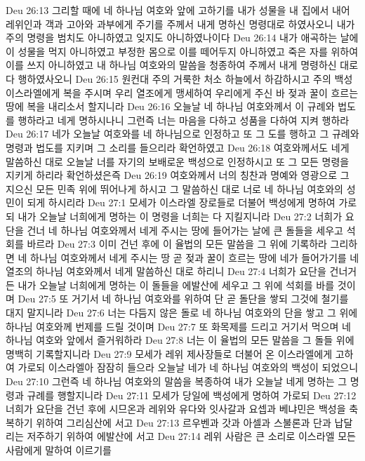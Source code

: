 Deu 26:13  그리할 때에 네 하나님 여호와 앞에 고하기를 내가 성물을 내 집에서 내어 레위인과 객과 고아와 과부에게 주기를 주께서 내게 명하신 명령대로 하였사오니 내가 주의 명령을 범치도 아니하였고 잊지도 아니하였나이다
Deu 26:14  내가 애곡하는 날에 이 성물을 먹지 아니하였고 부정한 몸으로 이를 떼어두지 아니하였고 죽은 자를 위하여 이를 쓰지 아니하였고 내 하나님 여호와의 말씀을 청종하여 주께서 내게 명령하신 대로 다 행하였사오니
Deu 26:15  원컨대 주의 거룩한 처소 하늘에서 하감하시고 주의 백성 이스라엘에게 복을 주시며 우리 열조에게 맹세하여 우리에게 주신 바 젖과 꿀이 흐르는 땅에 복을 내리소서 할지니라
Deu 26:16  오늘날 네 하나님 여호와께서 이 규례와 법도를 행하라고 네게 명하시나니 그런즉 너는 마음을 다하고 성품을 다하여 지켜 행하라
Deu 26:17  네가 오늘날 여호와를 네 하나님으로 인정하고 또 그 도를 행하고 그 규례와 명령과 법도를 지키며 그 소리를 들으리라 확언하였고
Deu 26:18  여호와께서도 네게 말씀하신 대로 오늘날 너를 자기의 보배로운 백성으로 인정하시고 또 그 모든 명령을 지키게 하리라 확언하셨은즉
Deu 26:19  여호와께서 너의 칭찬과 명예와 영광으로 그 지으신 모든 민족 위에 뛰어나게 하시고 그 말씀하신 대로 너로 네 하나님 여호와의 성민이 되게 하시리라
Deu 27:1  모세가 이스라엘 장로들로 더불어 백성에게 명하여 가로되 내가 오늘날 너희에게 명하는 이 명령을 너희는 다 지킬지니라
Deu 27:2  너희가 요단을 건너 네 하나님 여호와께서 네게 주시는 땅에 들어가는 날에 큰 돌들을 세우고 석회를 바르라
Deu 27:3  이미 건넌 후에 이 율법의 모든 말씀을 그 위에 기록하라 그리하면 네 하나님 여호와께서 네게 주시는 땅 곧 젖과 꿀이 흐르는 땅에 네가 들어가기를 네 열조의 하나님 여호와께서 네게 말씀하신 대로 하리니
Deu 27:4  너희가 요단을 건너거든 내가 오늘날 너희에게 명하는 이 돌들을 에발산에 세우고 그 위에 석회를 바를 것이며
Deu 27:5  또 거기서 네 하나님 여호와를 위하여 단 곧 돌단을 쌓되 그것에 철기를 대지 말지니라
Deu 27:6  너는 다듬지 않은 돌로 네 하나님 여호와의 단을 쌓고 그 위에 하나님 여호와께 번제를 드릴 것이며
Deu 27:7  또 화목제를 드리고 거기서 먹으며 네 하나님 여호와 앞에서 즐거워하라
Deu 27:8  너는 이 율법의 모든 말씀을 그 돌들 위에 명백히 기록할지니라
Deu 27:9  모세가 레위 제사장들로 더불어 온 이스라엘에게 고하여 가로되 이스라엘아 잠잠히 들으라 오늘날 네가 네 하나님 여호와의 백성이 되었으니
Deu 27:10  그런즉 네 하나님 여호와의 말씀을 복종하여 내가 오늘날 네게 명하는 그 명령과 규례를 행할지니라
Deu 27:11  모세가 당일에 백성에게 명하여 가로되
Deu 27:12  너희가 요단을 건넌 후에 시므온과 레위와 유다와 잇사갈과 요셉과 베냐민은 백성을 축복하기 위하여 그리심산에 서고
Deu 27:13  르우벤과 갓과 아셀과 스불론과 단과 납달리는 저주하기 위하여 에발산에 서고
Deu 27:14  레위 사람은 큰 소리로 이스라엘 모든 사람에게 말하여 이르기를
